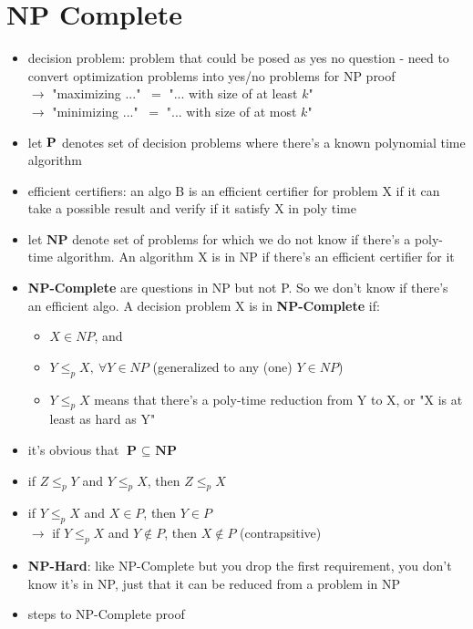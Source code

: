 \section*{NP Complete}
\begin{itemize}
    \item decision problem: problem that could be posed as yes no question - need to convert optimization problems into yes/no problems for NP proof\\
    $\longrightarrow$ "maximizing ..." $~=$ "... with size of at least $k$" \\
    $\longrightarrow$ "minimizing ..." $~=$ "... with size of at most $k$"
    \item let $\textbf P$ denotes set of decision problems where there's a known polynomial time algorithm
    \item efficient certifiers: an algo B is an efficient certifier for problem X if it can take a possible result and verify if it satisfy X in poly time
    \item let $\textbf{NP}$ denote set of problems for which we do not know if there's a poly-time algorithm. An algorithm X is in NP if there's an efficient certifier for it 
    \item \textbf{NP-Complete} are questions in NP but not P. So we don't know if there's an efficient algo. A decision problem X is in \textbf{NP-Complete} if: 
    \begin{itemize}[leftmargin = 1em]
        \item $X \in NP$, and
        \item $ Y \leq_p X,~ \forall Y \in NP$ (generalized to any (one) $Y \in NP$) 
        \item $Y \leq_p X$ means that there's a poly-time reduction from Y to X, or "X is at least as hard as Y"
    \end{itemize}
    \item it's obvious that $\textbf {P } \subseteq \textbf{ NP}$
    \item if $Z \leq_p Y$ and $Y \leq_p X$, then $Z \leq_p X$
    \item if $Y \leq_p X$ and $X \in P$, then $Y \in P$\\
    $\longrightarrow$ if $Y \leq_p X$ and $Y \not \in P$, then $X \not \in P$ (contrapsitive)
    \item \textbf{NP-Hard}: like NP-Complete but you drop the first requirement, you don't know it's in NP, just that it can be reduced from a problem in NP
    \item steps to NP-Complete proof

\end{itemize}
